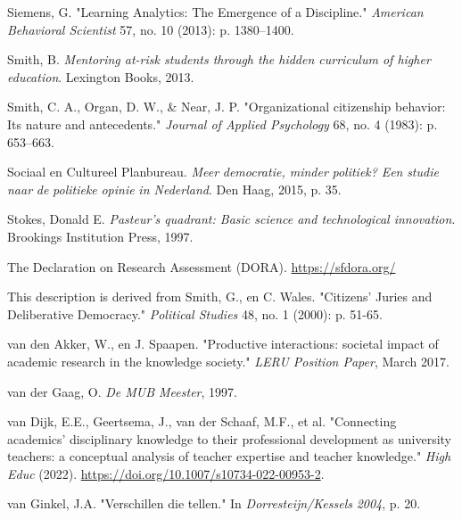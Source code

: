 \documentclass[smallauthor, chapterhaspagenum, nochapterinheader, pagenuminheader,  bigchapnum,medium2, tocpages,  garamond, titleinheader]{jote-book}
\begin{document}
\begin{references}
		Siemens, G. "Learning Analytics: The Emergence of a Discipline." \emph{American Behavioral Scientist} 57, no. 10 (2013): p. 1380--1400.



		Smith, B. \emph{Mentoring at-risk students through the hidden curriculum of higher education}. Lexington Books, 2013.



		Smith, C. A., Organ, D. W., \& Near, J. P. "Organizational citizenship behavior: Its nature and antecedents." \emph{Journal of Applied Psychology} 68, no. 4 (1983): p. 653--663.



		Sociaal en Cultureel Planbureau. \emph{Meer }\emph{democratie}\emph{, minder }\emph{politiek}\emph{? }\emph{Een}\emph{ }\emph{studie}\emph{ }\emph{naar}\emph{ de }\emph{politieke}\emph{ }\emph{opinie}\emph{ in Nederland}. Den Haag, 2015, p. 35.



		Stokes, Donald E. \emph{Pasteur's quadrant: Basic science and technological innovation}. Brookings Institution Press, 1997.



		The Declaration on Research Assessment (DORA). \href{https://sfdora.org/}{https://sfdora.org/}



		This description is derived from Smith, G., en C. Wales. "Citizens' Juries and Deliberative Democracy." \emph{Political Studies} 48, no. 1 (2000): p. 51-65.



		van den Akker, W., en J. Spaapen. "Productive interactions: societal impact of academic research in the knowledge society." \emph{LERU Position Paper}, March 2017.



		van der Gaag, O. \emph{De MUB Meester}, 1997.



		van Dijk, E.E., Geertsema, J., van der Schaaf, M.F., et al. "Connecting academics' disciplinary knowledge to their professional development as university teachers: a conceptual analysis of teacher expertise and teacher knowledge." \emph{High Educ} (2022). \href{https://doi.org/10.1007/s10734-022-00953-2}{https://doi.org/10.1007/s10734-022-00953-2}.



		van Ginkel, J.A. "Verschillen die tellen." In \emph{Dorresteijn}\emph{/}\emph{Kessels}\emph{ 2004}, p. 20.




\end{references}
\end{document}
